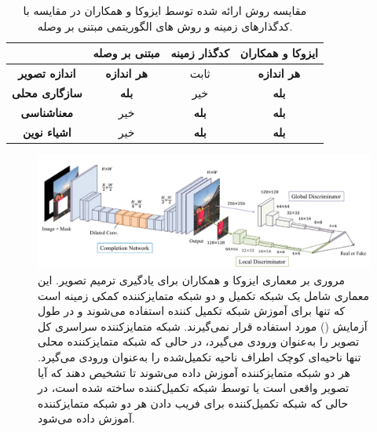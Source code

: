 \begin{table}[ht]
	\centering
	\begin{tabular}{|c|c|c|c|}
		\hline
		\textbf{} & \textbf{مبتنی بر وصله} & \textbf{کدگذار زمینه} & \textbf{ایزوکا و همکاران} \\
		\hline
		\textbf{اندازه تصویر} & \textbf{هر اندازه} & ثابت & \textbf{هر اندازه} \\
		\hline
		\textbf{سازگاری محلی} & \textbf{بله} & خیر & \textbf{بله} \\
		\hline
		\textbf{معناشناسی} & خیر & \textbf{بله} & \textbf{بله} \\
		\hline
		\textbf{اشیاء نوین} & خیر & \textbf{بله} & \textbf{بله} \\
		\hline
	\end{tabular}
	\caption{مقایسه روش‌ ارائه شده توسط ایزوکا  و همکاران در مقایسه با کدگذارهای زمینه و روش های الگوریتمی مبتنی بر وصله.}
\end{table}


\begin{figure}
	\centering
	\includegraphics[width=1\linewidth]{IISUKAArch1}
	\caption{مروری بر معماری ایزوکا و همکاران برای یادگیری ترمیم تصویر. این معماری شامل یک شبکه تکمیل و دو شبکه متمایزکننده کمکی زمینه است که تنها برای آموزش شبکه تکمیل  کننده استفاده می‌شوند و در طول آزمایش ()
		 مورد استفاده قرار نمی‌گیرند. شبکه متمایزکننده سراسری کل تصویر را به‌عنوان ورودی می‌گیرد، در حالی که شبکه متمایزکننده محلی تنها ناحیه‌ای کوچک اطراف ناحیه تکمیل‌شده را به‌عنوان ورودی می‌گیرد. هر دو شبکه متمایزکننده آموزش داده می‌شوند تا تشخیص دهند که آیا تصویر واقعی است یا توسط شبکه تکمیل‌کننده ساخته شده است، در حالی که شبکه تکمیل‌کننده برای فریب دادن هر دو شبکه متمایزکننده آموزش داده می‌شود.}
	\label{fig:iisukaarch1}
\end{figure}


